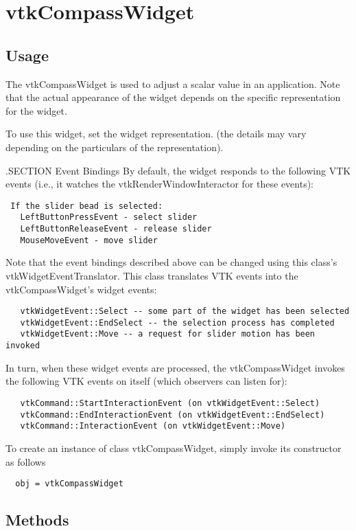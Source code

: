 \section{vtkCompassWidget}

\subsection{Usage}

 The vtkCompassWidget is used to adjust a scalar value in an 
 application. Note that the actual appearance of the widget depends on
 the specific representation for the widget.
 
 To use this widget, set the widget representation. (the details may
 vary depending on the particulars of the representation). 


 .SECTION Event Bindings
 By default, the widget responds to the following VTK events (i.e., it
 watches the vtkRenderWindowInteractor for these events):
 \begin{verbatim}
 If the slider bead is selected:
   LeftButtonPressEvent - select slider 
   LeftButtonReleaseEvent - release slider 
   MouseMoveEvent - move slider
 \end{verbatim}

 Note that the event bindings described above can be changed using this
 class's vtkWidgetEventTranslator. This class translates VTK events 
 into the vtkCompassWidget's widget events:
 \begin{verbatim}
   vtkWidgetEvent::Select -- some part of the widget has been selected
   vtkWidgetEvent::EndSelect -- the selection process has completed
   vtkWidgetEvent::Move -- a request for slider motion has been invoked
 \end{verbatim}

 In turn, when these widget events are processed, the vtkCompassWidget
 invokes the following VTK events on itself (which observers can listen for):
 \begin{verbatim}
   vtkCommand::StartInteractionEvent (on vtkWidgetEvent::Select)
   vtkCommand::EndInteractionEvent (on vtkWidgetEvent::EndSelect)
   vtkCommand::InteractionEvent (on vtkWidgetEvent::Move)
 \end{verbatim}


To create an instance of class vtkCompassWidget, simply
invoke its constructor as follows
\begin{verbatim}
  obj = vtkCompassWidget
\end{verbatim}
\subsection{Methods}

